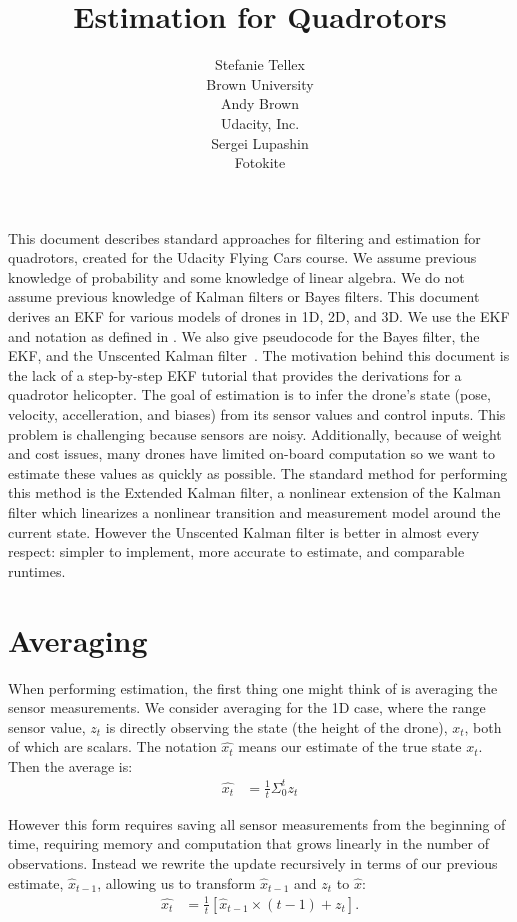 \documentclass{article}
\title{Estimation for Quadrotors}
\author{\parbox{0.3\linewidth}{\centering Stefanie Tellex\\Brown University}
  \parbox{0.3\linewidth}{\centering Andy Brown\\Udacity, Inc.}
\parbox{0.3\linewidth}{\centering Sergei Lupashin\\Fotokite}    
}
\begin{document}
\maketitle

This document describes standard approaches for filtering and
estimation for quadrotors, created for the Udacity Flying Cars course.
We assume previous knowledge of probability and some knowledge of
linear algebra.  We do not assume previous knowledge of Kalman filters
or Bayes filters.  This document derives an EKF for various models of
drones in 1D, 2D, and 3D.  We use the EKF and notation as defined in
\citet{thrun2005probabilistic}.  We also give pseudocode for the Bayes
filter, the EKF, and the Unscented Kalman
filter~\citep{wan2000unscented}.  The motivation behind this document
is the lack of a step-by-step EKF tutorial that provides the
derivations for a quadrotor helicopter.  The goal of estimation is to
infer the drone's state (pose, velocity, accelleration, and biases)
from its sensor values and control inputs.  This problem is
challenging because sensors are noisy.  Additionally, because of
weight and cost issues, many drones have limited on-board computation
so we want to estimate these values as quickly as possible.  The
standard method for performing this method is the Extended Kalman
filter, a nonlinear extension of the Kalman filter which linearizes a
nonlinear transition and measurement model around the current state.
However the Unscented Kalman filter is better in almost every respect:
simpler to implement, more accurate to estimate, and comparable
runtimes.

\section{Averaging}

When performing estimation, the first thing one might think of is
averaging the sensor measurements.  We consider averaging for the 1D
case, where the range sensor value, $z_t$ is directly observing the
state (the height of the drone), $x_t$, both of which are scalars.
The notation $\hat{x_t}$ means our estimate of the true state $x_t$.
Then the average is:
\begin{align}
  \hat{x_t} &= \frac{1}{t} \Sigma_0^t z_t
\end{align}

\noindent However this form requires saving all sensor measurements from the beginning of time, requiring memory and computation that grows linearly in the number of observations.    Instead we rewrite the update recursively in terms of our previous estimate, $\hat{x}_{t-1}$, allowing us to transform $\hat{x}_{t-1}$ and $z_t$ to $\hat{x}$:
  \begin{align}
    \hat{x_t} &= \frac{1}{t} \left[ \hat{x}_{t-1} \times (t-1) + z_t \right].
  \end{align}
\end{document}

